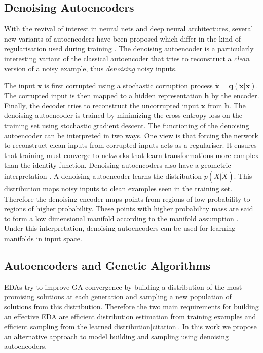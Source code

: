 \documentclass[runningheads,a4paper]{llncs}
\begin{document}
\subsection{Denoising Autoencoders}

With the revival of interest in neural nets and deep neural architectures, several new variants of autoencoders have been proposed which differ in the kind of regularisation used during training \cite{vincent2010stacked,rifai2011contractive}. The denoising autoencoder is a particularly interesting variant of the classical autoencoder that tries to reconstruct a \textit{clean} version of a noisy example, thus \textit{denoising} noisy inputs. 

The input $\mathbf x$ is first corrupted using a stochastic corruption process $\mathbf{\tilde x = q(\tilde x|x)}$. The corrupted input is then mapped to a hidden representation $\mathbf h$ by the encoder. Finally, the decoder tries to reconstruct the uncorrupted input $\mathbf x$ from $\mathbf h$. The denoising autoencoder is trained by minimizing the cross-entropy loss on the training set using stochastic gradient descent. The functioning of the denoising autoencoder can be interpreted in two ways. One view is that forcing the network to reconstruct clean inputs from corrupted inputs acts as a regulariser. It ensures that training must converge to networks that learn transformations more complex than the identity function. Denoising autoencoders also have a geometric interpretation \cite{vincent2010stacked}. A denoising autoencoder learns the distribution $p(X|\tilde X)$. This distribution maps noisy inputs to clean examples seen in the training set. Therefore the denoising encoder maps points from regions of low probability to regions of higher probability. These points with higher probability mass are said to form a low dimensional manifold according to the manifold assumption \cite{chapelle2006semi}. Under this interpretation, denoising autoencoders can be used for learning manifolds in input space.

\subsection{Autoencoders and Genetic Algorithms}
EDAs try to improve GA convergence by building a distribution of the most promising solutions at each generation and sampling a new population of solutions from this distribution. Therefore the two main requirements for building an effective EDA are efficient distribution estimation from training examples and efficient sampling from the learned distribution[citation]. In this work we propose an alternative approach to model building and sampling using denoising autoencoders. 
\end{document}
